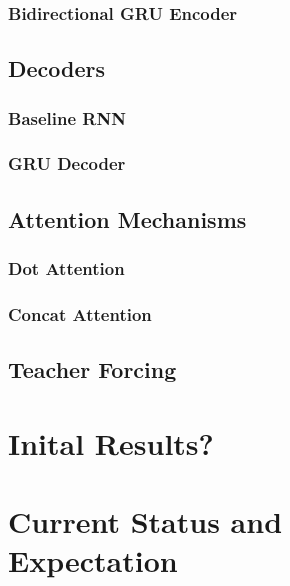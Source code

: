 \documentclass[twoside,twocolumn]{article}
\begin{document}
\subsubsection{Bidirectional GRU Encoder}

\subsection{Decoders}
\subsubsection{Baseline RNN}
\subsubsection{GRU Decoder}

\subsection{Attention Mechanisms}
\subsubsection{Dot Attention}
\subsubsection{Concat Attention}

\subsection{Teacher Forcing}

\section{Inital Results?}

\section{Current Status and\\Expectation}



\end{document}
